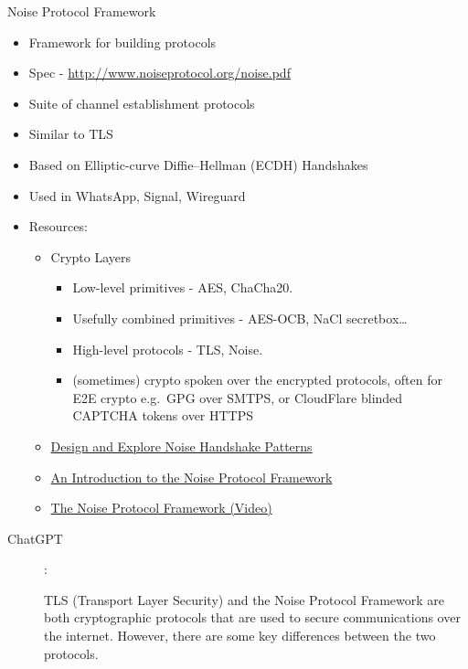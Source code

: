 \hypertarget{notes__02022-noise.md}{}
\begin{block}{Noise Protocol Framework}
\protect\hypertarget{notes__02022-noise.md__noise-protocol-framework}{}
\begin{itemize}
\tightlist
\item
  Framework for building protocols
\item
  Spec - \url{http://www.noiseprotocol.org/noise.pdf}
\item
  Suite of channel establishment protocols
\item
  Similar to TLS
\item
  Based on Elliptic-curve Diffie--Hellman (ECDH) Handshakes
\item
  Used in WhatsApp, Signal, Wireguard
\item
  Resources:

  \begin{itemize}
  \tightlist
  \item
    Crypto Layers

    \begin{itemize}
    \tightlist
    \item
      Low-level primitives - AES, ChaCha20.
    \item
      Usefully combined primitives - AES-OCB, NaCl secretbox\ldots{}
    \item
      High-level protocols - TLS, Noise.
    \item
      (sometimes) crypto spoken over the encrypted protocols, often for
      E2E crypto e.g.~GPG over SMTPS, or CloudFlare blinded CAPTCHA
      tokens over HTTPS
    \end{itemize}
  \item
    \href{https://noiseexplorer.com/}{Design and Explore Noise Handshake
    Patterns}
  \item
    \href{https://duo.com/labs/tech-notes/noise-protocol-framework-intro}{An
    Introduction to the Noise Protocol Framework}
  \item
    \href{https://www.youtube.com/watch?v=ceGTgqypwnQ}{The Noise
    Protocol Framework (Video)}
  \end{itemize}
\end{itemize}

\begin{description}
\item[ChatGPT]
:

TLS (Transport Layer Security) and the Noise Protocol Framework are both
cryptographic protocols that are used to secure communications over the
internet. However, there are some key differences between the two
protocols.


\end{description}
\end{block}
